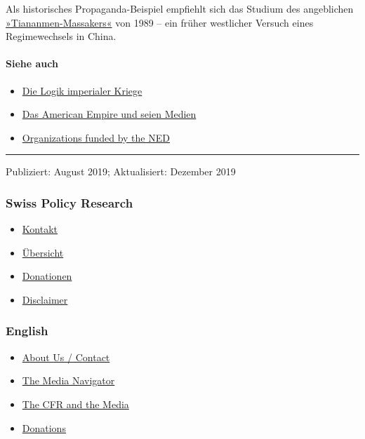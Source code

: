 Als historisches Propaganda-Beispiel empfiehlt sich das Studium des
angeblichen
\href{https://www.rubikon.news/artikel/das-fake-massaker}{»Tiananmen-Massakers«}
von 1989 -- ein früher westlicher Versuch eines Regimewechsels in China.

\hypertarget{siehe-auch}{%
\paragraph{Siehe auch}\label{siehe-auch}}

\begin{itemize}
\tightlist
\item
  \href{https://swprs.org/logik-imperialer-kriege/}{Die Logik imperialer
  Kriege}
\item
  \href{https://swprs.org/das-american-empire-und-seine-medien/}{Das
  American Empire und seien Medien}
\item
  \href{https://swprs.org/organizations-funded-by-the-ned/}{Organizations
  funded by the NED}
\end{itemize}

\begin{center}\rule{0.5\linewidth}{\linethickness}\end{center}

Publiziert: August 2019; Aktualisiert: Dezember 2019

\hypertarget{swiss-policy-research}{%
\subsubsection{Swiss Policy Research}\label{swiss-policy-research}}

\begin{itemize}
\tightlist
\item
  \href{https://swprs.org/kontakt/}{Kontakt}
\item
  \href{https://swprs.org/uebersicht/}{Übersicht}
\item
  \href{https://swprs.org/donationen/}{Donationen}
\item
  \href{https://swprs.org/disclaimer/}{Disclaimer}
\end{itemize}

\hypertarget{english}{%
\subsubsection{English}\label{english}}

\begin{itemize}
\tightlist
\item
  \href{https://swprs.org/contact/}{About Us / Contact}
\item
  \href{https://swprs.org/media-navigator/}{The Media Navigator}
\item
  \href{https://swprs.org/the-american-empire-and-its-media/}{The CFR
  and the Media}
\item
  \href{https://swprs.org/donations/}{Donations}
\end{itemize}


